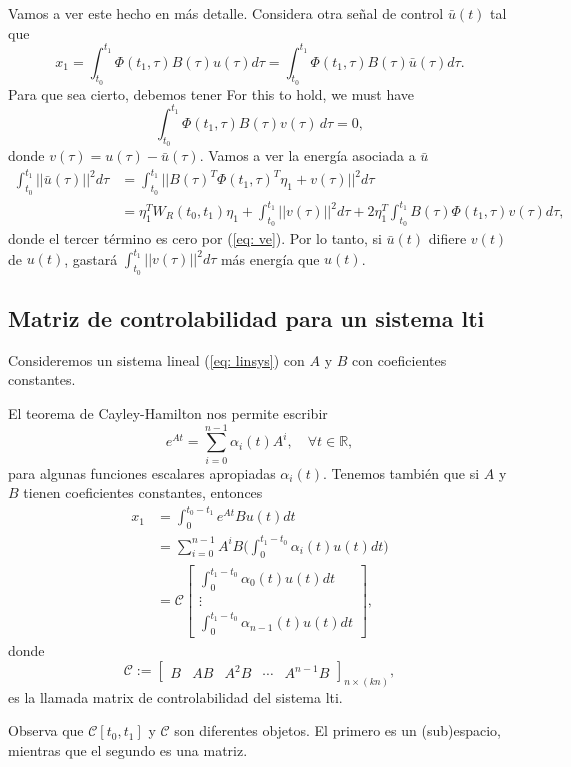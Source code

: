 Vamos a ver este hecho en más detalle. Considera otra señal de control  $\bar u(t)$ tal que 
\begin{equation}
x_1 = \int_{t_0}^{t_1} \Phi(t_1,\tau)B(\tau)u(\tau)d\tau = \int_{t_0}^{t_1} \Phi(t_1,\tau)B(\tau)\bar u(\tau)d\tau.
\end{equation}
Para que sea cierto, debemos tener
For this to hold, we must have
\begin{equation}
	\int_{t_0}^{t_1} \Phi(t_1,\tau)B(\tau)v(\tau) \, d\tau = 0,
	\label{eq: ve}
\end{equation}
donde $v(\tau) = u(\tau) - \bar u(\tau)$.
Vamos a ver la energía asociada a $\bar u$
\begin{align}
\int_{t_0}^{t_1}||\bar u(\tau)||^2 d\tau &= \int_{t_0}^{t_1} || B(\tau)^T\Phi(t_1,\tau)^T \eta_1 + v(\tau)||^2 d\tau \nonumber \\ 
&= \eta_1^T W_R(t_0,t_1)\eta_1 + \int_{t_0}^{t_1} ||v(\tau)||^2 d \tau + 2\eta_1^T \int_{t_0}^{t_1}B(\tau)\Phi(t_1,\tau)v(\tau) d \tau,
\end{align}
donde el tercer término es cero por (\ref{eq: ve}). Por lo tanto, si $\bar u(t)$ difiere $v(t)$ de $u(t)$, gastará $\int_{t_0}^{t_1} ||v(\tau)||^2 d\tau$ más energía que $u(t)$.

\subsection{Matriz de controlabilidad para un sistema lti}

Consideremos un sistema lineal (\ref{eq: linsys}) con $A$ y $B$ con coeficientes constantes.

El teorema de Cayley-Hamilton nos permite escribir
\begin{equation}
	e^{At} = \sum_{i=0}^{n-1}\alpha_i(t)A^i, \quad \forall t\in\mathbb{R},
\end{equation}
para algunas funciones escalares apropiadas $\alpha_i(t)$. Tenemos también que si $A$ y $B$ tienen coeficientes constantes, entonces
\begin{align}
	x_1 &= \int_{0}^{t_0-t_1} e^{At}Bu(t) dt \nonumber \\
	&= \sum_{i=0}^{n-1} A^iB \Big(\int_{0}^{t_1-t_0}\alpha_i(t)u(t)dt \Big) \nonumber \\
	&= \mathcal{C} \begin{bmatrix}\int_{0}^{t_1-t_0}\alpha_0(t)u(t)dt \\ \vdots \\ \int_{0}^{t_1-t_0} \alpha_{n-1}(t)u(t)dt \end{bmatrix},
\end{align}
donde
\begin{equation}
\mathcal{C}:=\begin{bmatrix}B & AB & A^2B & \cdots & A^{n-1}B
\end{bmatrix}_{n\times (kn)},
	\label{eq: conmat}
\end{equation}
es la llamada matrix de controlabilidad del sistema lti.
\begin{remark}Observa que $\mathcal{C}[t_0,t_1]$ y $\mathcal{C}$  son diferentes objetos. El primero es un (sub)espacio, mientras que el segundo es una matriz.
\end{remark}

